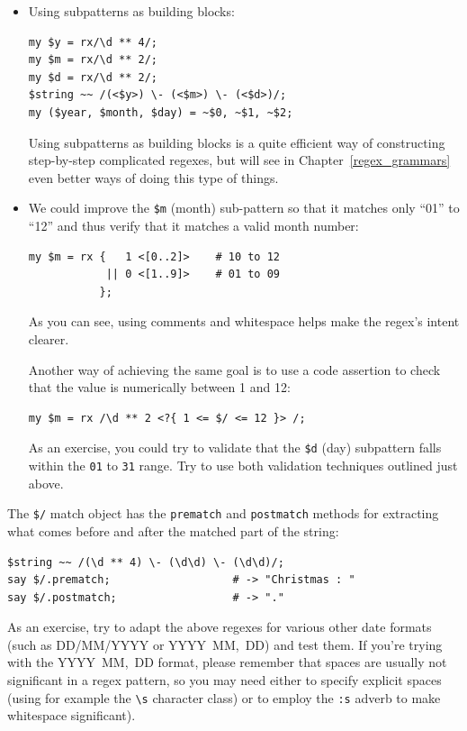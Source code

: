\begin{itemize}
\item Using subpatterns as building blocks:
\begin{verbatim}
my $y = rx/\d ** 4/;
my $m = rx/\d ** 2/;
my $d = rx/\d ** 2/;
$string ~~ /(<$y>) \- (<$m>) \- (<$d>)/;
my ($year, $month, $day) = ~$0, ~$1, ~$2;
\end{verbatim}
%

Using subpatterns as building blocks is a quite efficient 
way of constructing step-by-step complicated regexes, but 
will see in Chapter~\ref{regex_grammars} even better ways 
of doing this type of things.

\item We could improve the \verb'$m' (month) sub-pattern so 
that it matches only ``01'' to ``12'' and thus 
verify that it matches a valid month number:

\begin{verbatim}
my $m = rx {   1 <[0..2]>    # 10 to 12
            || 0 <[1..9]>    # 01 to 09
           };
\end{verbatim}
%

As you can see, using comments and whitespace helps 
make the regex's intent clearer.

Another way of achieving the same goal is to use a 
code assertion to check that the value is numerically 
between 1 and 12:

\begin{verbatim}
my $m = rx /\d ** 2 <?{ 1 <= $/ <= 12 }> /;
\end{verbatim}

As an exercise, you could try to validate that the \verb'$d' 
(day) subpattern falls within the \verb'01' to \verb'31' 
range. Try to use both validation techniques outlined just 
above.

\end{itemize}

The \verb'$/' match object has the {\tt prematch} and 
{\tt postmatch} methods for extracting what comes before 
and after the matched part of the string:

\begin{verbatim}
$string ~~ /(\d ** 4) \- (\d\d) \- (\d\d)/;
say $/.prematch;                   # -> "Christmas : "
say $/.postmatch;                  # -> "."
\end{verbatim}
%

As an exercise, try to adapt the above regexes for various 
other date formats (such as DD/MM/YYYY or 
YYYY~MM,~DD) and test them. If you're trying with 
the YYYY~MM,~DD format, please remember that spaces are 
usually not significant in a regex pattern, so you may need 
either to specify explicit spaces (using for example the \verb'\s' 
character class) or to employ the \verb':s' adverb to make 
whitespace significant). 

